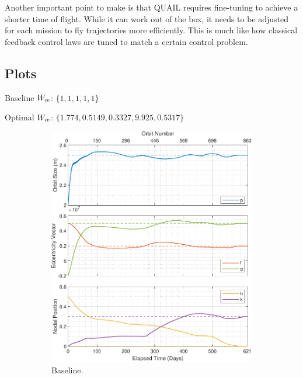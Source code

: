 Another important point to make is that QUAIL requires fine-tuning to achieve a shorter time of flight. While it can work out of the box, it needs to be adjusted for each mission to fly trajectories more efficiently. This is much like how classical feedback control laws are tuned to match a certain control problem.

\newpage
\subsection{Plots}
\label{sec:bench_case_plot}
Baseline \(W_{\moe}\): \(\{1, 1, 1, 1, 1\}\)


Optimal \(W_{\moe}\): \(\{1.774, 0.5149, 0.3327, 9.925, 0.5317\}\)

\begin{figure}[H]
    \centering
    \begin{subfigure}[t]{0.49\textwidth}
        \includegraphics[width=\textwidth]{figures/benchmark_transfer/orbital_elements.pdf}
        \caption{Baseline.}
        \label{fig:results_optim_a_1}
    \end{subfigure}
    \begin{subfigure}[t]{0.49\textwidth}

\end{subfigure}
\end{figure}
